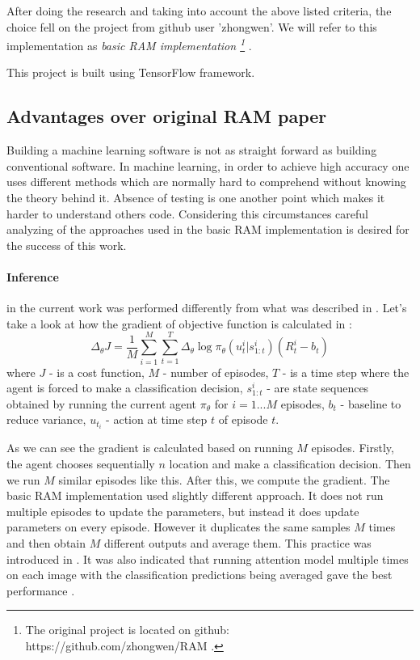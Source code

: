 {After doing the research and taking into account the above listed criteria,
the choice fell on the project from github user 'zhongwen'. We will refer to
this implementation as \emph{
	basic RAM implementation
	\footnote{The original project is located on github: https://github.com/zhongwen/RAM .}
}.

This project is built using TensorFlow framework.

\subsection{Advantages over original RAM paper}
Building a machine learning software is not as straight forward as building
conventional software. In machine learning, in order to achieve high accuracy
one uses different methods which are normally hard to comprehend without knowing
the theory behind it. Absence of testing is one another point which makes it
harder to understand others code. Considering this circumstances careful
analyzing of the approaches used in the basic RAM implementation
is desired for the success of this work.

\paragraph{Inference} in the current work was performed differently from what was
described in \cite{DBLP:journals/corr/MnihHGK14}.
Let's take a look at how the gradient of objective function is calculated in \cite{DBLP:journals/corr/MnihHGK14}:
\begin{equation} \label{eq:}
	\Delta_{\theta} J = \frac{1}{M} \sum_{i=1}^M \sum_{t=1}^T
		\Delta_{\theta} \log \pi_{\theta}(u_t^i| s_{1:t}^i) (R_t^i - b_t)
\end{equation}
where $J$ - is a cost function, $M$ - number of episodes,
$T$ - is a time step where the agent is forced to make a classification decision,
$s_{1:t}^i$ - are state sequences obtained by
running the current agent $\pi_{\theta}$ for $i = 1 . . .M$ episodes,
$b_t$ - baseline to reduce variance, $u_t_i$ - action at time step $t$
of episode $t$.

As we can see the gradient is calculated based on running $M$ episodes.
Firstly, the agent chooses sequentially $n$ location and make a classification
decision. Then we run $M$ similar episodes like this. After this,
we compute the gradient. The basic RAM implementation used slightly different
approach. It does not run multiple episodes to update the parameters, but instead
it does update parameters on every episode. However it duplicates the same
samples $M$ times and then obtain $M$ different outputs and average them.
This practice was introduced in \cite{DBLP:journals/corr/BaMK14}.
It was also indicated that running attention model multiple times on each
image with the classification predictions being averaged gave the best
performance \cite{DBLP:journals/corr/BaMK14}.


}
